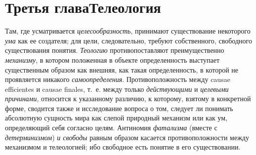 {{\chapter[Третья глава Телеология]{Третья глава\newline Телеология}
Там, где усматривается
{\em целесообразность},
принимают существование некоторого
{\em ума} как ее
создателя; для цели, следовательно, требуют собственного, свободного
существования понятия. {\em Теологию}
противопоставляют преимущественно
{\em механизму}, в
котором положенная в объекте определенность выступает существенным образом
как внешняя, как такая определенность, в которой не проявляется никакого
{\em самоопределения}.
Противоположность между causae efficientes и
causae finales, т.~е. между только
{\em действующими} и
{\em целевыми причинами},
относится к указанному различию, к которому, взятому в
конкретной форме, сводится также и исследование вопроса о том, следует ли
понимать абсолютную сущность мира как слепой природный механизм или как ум,
определяющий себя согласно целям. Антиномия
{\em фатализма} (вместе с
{\em детерминизмом})
{\em и свободы} равным
образом касается противоположности между механизмом и телеологией; ибо
свободное есть понятие в его существовании.

}}
